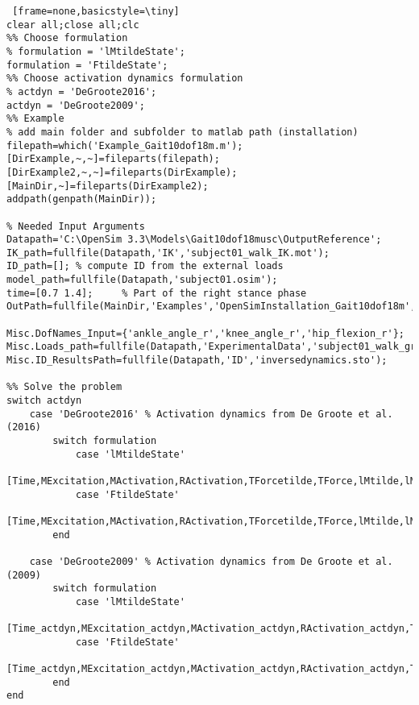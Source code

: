 \documentclass[a4paper,oneside,11pt]{article}
\begin{document}
\begin{lstlisting} [frame=none,basicstyle=\tiny]
clear all;close all;clc
%% Choose formulation
% formulation = 'lMtildeState';
formulation = 'FtildeState';
%% Choose activation dynamics formulation
% actdyn = 'DeGroote2016';
actdyn = 'DeGroote2009';
%% Example
% add main folder and subfolder to matlab path (installation)
filepath=which('Example_Gait10dof18m.m'); [DirExample,~,~]=fileparts(filepath); [DirExample2,~,~]=fileparts(DirExample); [MainDir,~]=fileparts(DirExample2);
addpath(genpath(MainDir));

% Needed Input Arguments
Datapath='C:\OpenSim 3.3\Models\Gait10dof18musc\OutputReference';
IK_path=fullfile(Datapath,'IK','subject01_walk_IK.mot');
ID_path=[]; % compute ID from the external loads
model_path=fullfile(Datapath,'subject01.osim');
time=[0.7 1.4];     % Part of the right stance phase
OutPath=fullfile(MainDir,'Examples','OpenSimInstallation_Gait10dof18m','Results');

Misc.DofNames_Input={'ankle_angle_r','knee_angle_r','hip_flexion_r'};
Misc.Loads_path=fullfile(Datapath,'ExperimentalData','subject01_walk_grf.xml');
Misc.ID_ResultsPath=fullfile(Datapath,'ID','inversedynamics.sto');

%% Solve the problem
switch actdyn
    case 'DeGroote2016' % Activation dynamics from De Groote et al. (2016)        
        switch formulation
            case 'lMtildeState'
                [Time,MExcitation,MActivation,RActivation,TForcetilde,TForce,lMtilde,lM,MuscleNames,OptInfo,DatStore]=SolveMuscleRedundancy_lMtildeState(model_path,IK_path,ID_path,time,OutPath,Misc);
            case 'FtildeState'   
                [Time,MExcitation,MActivation,RActivation,TForcetilde,TForce,lMtilde,lM,MuscleNames,OptInfo,DatStore]=SolveMuscleRedundancy_FtildeState(model_path,IK_path,ID_path,time,OutPath,Misc);
        end
        
    case 'DeGroote2009' % Activation dynamics from De Groote et al. (2009)   
        switch formulation
            case 'lMtildeState'
                [Time_actdyn,MExcitation_actdyn,MActivation_actdyn,RActivation_actdyn,TForcetilde_actdyn,TForce_actdyn,lMtilde_actdyn,lM_actdyn,MuscleNames_actdyn,OptInfo_actdyn,DatStore_actdyn]=SolveMuscleRedundancy_lMtildeState_actdyn(model_path,IK_path,ID_path,time,OutPath,Misc);
            case 'FtildeState'   
                [Time_actdyn,MExcitation_actdyn,MActivation_actdyn,RActivation_actdyn,TForcetilde_actdyn,TForce_actdyn,lMtilde_actdyn,lM_actdyn,MuscleNames_actdyn,OptInfo_actdyn,DatStore_actdyn]=SolveMuscleRedundancy_FtildeState_actdyn(model_path,IK_path,ID_path,time,OutPath,Misc);
        end
end
\end{lstlisting}
\end{document}
